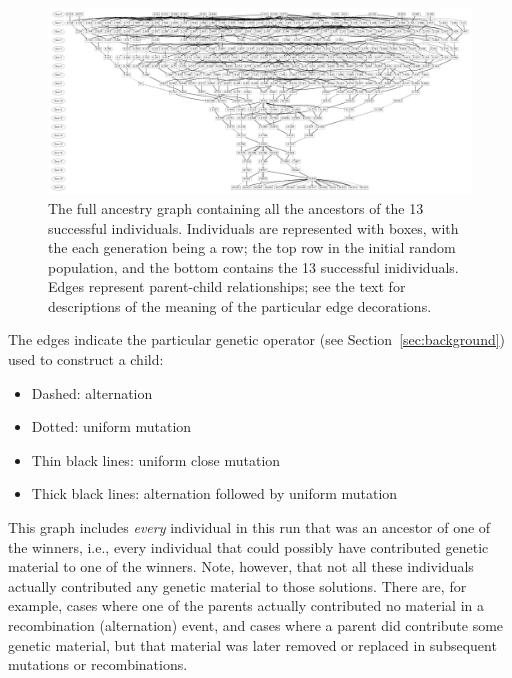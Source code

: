 \documentclass[graybox]{svmult}
\begin{document}
\begin{figure} %
	\begin{center}
		\vspace{0.6\columnwidth}
		\includegraphics[width=\columnwidth]{../figures/run0_GPTP_2_font_30}
	\end{center}
	\caption{The full ancestry graph containing all the ancestors of the 13
		successful individuals. Individuals are represented with boxes, with the each generation being a row; the top row in the initial random
		population, and the bottom contains the 13 successful inidividuals.
		Edges represent parent-child relationships; see the text for 
		descriptions of the meaning of the particular edge decorations.}
	\label{fig:run0Labelled}       %
\end{figure}

The edges indicate the particular genetic operator (see Section~\ref{sec:background}) used to construct a child:
\begin{itemize}
	\item Dashed: alternation
	\item Dotted: uniform mutation
	\item Thin black lines: uniform close mutation
	\item Thick black lines: alternation followed by uniform mutation
\end{itemize}

This graph includes \emph{every} individual in this run that was an 
ancestor of one of the winners, i.e., every individual that could possibly have 
contributed genetic material to one of the winners. Note, however, that not
all these individuals actually contributed any genetic material to those
solutions. There are, for example, cases where one of the parents actually
contributed no material in a recombination (alternation) event, and cases where
a parent did contribute some genetic material, but that material was later
removed or replaced in subsequent mutations or recombinations. 
\end{document}
